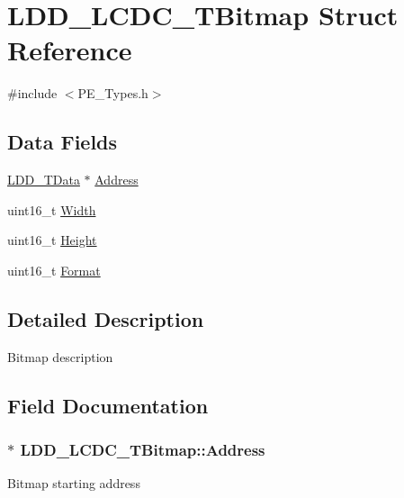 \hypertarget{struct_l_d_d___l_c_d_c___t_bitmap}{}\section{L\+D\+D\+\_\+\+L\+C\+D\+C\+\_\+\+T\+Bitmap Struct Reference}
\label{struct_l_d_d___l_c_d_c___t_bitmap}


{\ttfamily \#include $<$P\+E\+\_\+\+Types.\+h$>$}

\subsection*{Data Fields}
\begin{DoxyCompactItemize}
\item 
\hyperlink{group___p_e___types__module_gade8ef9401405bd941b6da738b807f980}{L\+D\+D\+\_\+\+T\+Data} $\ast$ \hyperlink{struct_l_d_d___l_c_d_c___t_bitmap_a5501acee73fa929201a06eccc4821a7a}{Address}
\item 
uint16\+\_\+t \hyperlink{struct_l_d_d___l_c_d_c___t_bitmap_af88017bd29e49292265c1fda6dc5463d}{Width}
\item 
uint16\+\_\+t \hyperlink{struct_l_d_d___l_c_d_c___t_bitmap_a13fea31674709c4f681e6c86d3b71206}{Height}
\item 
uint16\+\_\+t \hyperlink{struct_l_d_d___l_c_d_c___t_bitmap_a8f886a6ce6e67d4b070c20bdd5ce495a}{Format}
\end{DoxyCompactItemize}


\subsection{Detailed Description}
Bitmap description 

\subsection{Field Documentation}
\subsubsection[{\texorpdfstring{Address}{Address}}]{$\ast$ L\+D\+D\+\_\+\+L\+C\+D\+C\+\_\+\+T\+Bitmap\+::\+Address}\hypertarget{struct_l_d_d___l_c_d_c___t_bitmap_a5501acee73fa929201a06eccc4821a7a}{}\label{struct_l_d_d___l_c_d_c___t_bitmap_a5501acee73fa929201a06eccc4821a7a}
Bitmap starting address 
